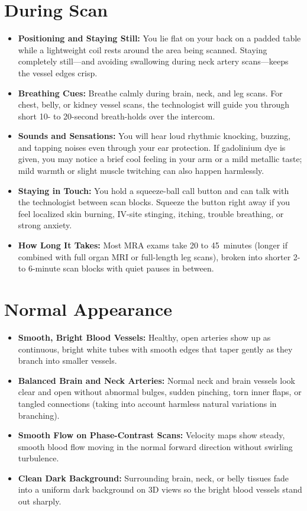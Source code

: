\section{During Scan}
\begin{itemize}
\item \textbf{Positioning and Staying Still:} You lie flat on your back on a padded table while a lightweight coil rests around the area being scanned. Staying completely still---and avoiding swallowing during neck artery scans---keeps the vessel edges crisp.
\item \textbf{Breathing Cues:} Breathe calmly during brain, neck, and leg scans. For chest, belly, or kidney vessel scans, the technologist will guide you through short 10- to 20-second breath-holds over the intercom.
\item \textbf{Sounds and Sensations:} You will hear loud rhythmic knocking, buzzing, and tapping noises even through your ear protection. If gadolinium dye is given, you may notice a brief cool feeling in your arm or a mild metallic taste; mild warmth or slight muscle twitching can also happen harmlessly.
\item \textbf{Staying in Touch:} You hold a squeeze-ball call button and can talk with the technologist between scan blocks. Squeeze the button right away if you feel localized skin burning, IV-site stinging, itching, trouble breathing, or strong anxiety.
\item \textbf{How Long It Takes:} Most MRA exams take 20 to 45~minutes (longer if combined with full organ MRI or full-length leg scans), broken into shorter 2- to 6-minute scan blocks with quiet pauses in between.
\end{itemize}

\section{Normal Appearance}
\begin{itemize}
\item \textbf{Smooth, Bright Blood Vessels:} Healthy, open arteries show up as continuous, bright white tubes with smooth edges that taper gently as they branch into smaller vessels.
\item \textbf{Balanced Brain and Neck Arteries:} Normal neck and brain vessels look clear and open without abnormal bulges, sudden pinching, torn inner flaps, or tangled connections (taking into account harmless natural variations in branching).
\item \textbf{Smooth Flow on Phase-Contrast Scans:} Velocity maps show steady, smooth blood flow moving in the normal forward direction without swirling turbulence.
\item \textbf{Clean Dark Background:} Surrounding brain, neck, or belly tissues fade into a uniform dark background on 3D views so the bright blood vessels stand out sharply.
\end{itemize}


